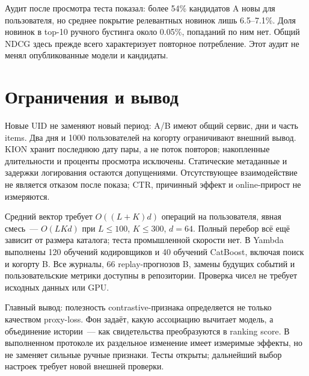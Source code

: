 \documentclass[10pt,a4paper,twocolumn]{article}
\begin{document}
Аудит после просмотра теста показал: более 54\% кандидатов A
новы для пользователя, но среднее покрытие релевантных новинок
лишь 6.5--7.1\%. Доля новинок в top-10 ручного бустинга около 0.05\%, попаданий по ним нет.
Общий NDCG здесь прежде всего характеризует повторное потребление.
Этот аудит не менял опубликованные модели и кандидаты.

\section{Ограничения и вывод}
Новые UID не заменяют новый период: A/B имеют общий сервис, дни и часть items.
Два дня и 1000 пользователей на когорту ограничивают внешний вывод.
KION хранит последнюю дату пары, а не поток повторов; накопленные длительности
и проценты просмотра исключены. Статические метаданные и задержки логирования остаются
допущениями. Отсутствующее взаимодействие не является отказом после показа;
CTR, причинный эффект и online-прирост не измеряются.

Средний вектор требует $O((L+K)d)$ операций на пользователя,
явная смесь~--- $O(LKd)$ при $L\le100$, $K\le300$, $d=64$.
Полный перебор всё ещё зависит от размера каталога; теста промышленной скорости нет.
В Yambda выполнены 120 обучений кодировщиков и 40 обучений CatBoost, включая поиск
и когорту B. Все журналы, 66 replay-прогнозов B, замены будущих событий
и пользовательские метрики доступны в репозитории. Проверка чисел не требует исходных данных или GPU.

Главный вывод: полезность contrastive-признака определяется не только
качеством proxy-loss. Фон задаёт, какую ассоциацию вычитает модель,
а объединение истории~--- как свидетельства преобразуются в ranking score.
В выполненном протоколе их раздельное изменение имеет измеримые эффекты,
но не заменяет сильные ручные признаки. Тесты открыты; дальнейший выбор
настроек требует новой внешней проверки.
\end{document}
